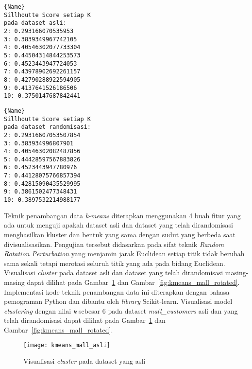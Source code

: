 \noindent\begin{minipage}{.44\textwidth}
\begin{lstlisting}[caption=Sillhoutte Score Dataset (Asli),frame=tlrb, label=mall_customers_siluet_asli]{Name}
Sillhoutte Score setiap K
pada dataset asli: 
2: 0.293166070535953
3: 0.3839349967742105
4: 0.40546302077733304
5: 0.44504314844253573
6: 0.4523443947724053
7: 0.43978902692261157
8: 0.42790288922594905
9: 0.4137641526186506
10: 0.3750147687842441
\end{lstlisting}
\end{minipage}\hfill
\begin{minipage}{.44\textwidth}
\begin{lstlisting}[caption=Sillhoutte Score (Randomisasi),frame=tlrb, label=mall_customers_siluet_randomisasi]{Name}
Sillhoutte Score setiap K
pada dataset randomisasi: 
2: 0.29316607053507854
3: 0.383934996807901
4: 0.40546302082487856
5: 0.44428597567883826
6: 0.4523443947780976
7: 0.44128075766857394
8: 0.42815090435529995
9: 0.3861502477348431
10: 0.3897532214988177
\end{lstlisting}
\end{minipage}

Teknik penambangan data \textit{k-means} diterapkan menggunakan 4 buah fitur yang ada untuk menguji apakah dataset asli dan dataset yang telah dirandomisasi menghasilkan kluster dan bentuk yang sama dengan sudut yang berbeda saat divisualisasikan. Pengujian tersebut didasarkan pada sifat teknik \textit{Random Rotation Perturbation} yang menjamin jarak Euclidean setiap titik tidak berubah sama sekali tetapi merotasi seluruh titik yang ada pada bidang Euclidean. Visualisasi \textit{cluster} pada dataset asli dan dataset yang telah dirandomisasi masing-masing dapat dilihat pada Gambar~\ref{fig:kmeans_mall_asli} dan Gambar~\ref{fig:kmeans_mall_rotated}. Implementasi kode teknik penambangan data ini diterapkan dengan bahasa pemograman Python dan dibantu oleh \textit{library} Scikit-learn. Visualisasi model \textit{clustering} dengan nilai \textit{k} sebesar 6 pada dataset \textit{mall\_customers} asli dan yang telah dirandomisasi dapat dilihat pada Gambar~\ref{fig:kmeans_mall_asli} dan Gambar~\ref{fig:kmeans_mall_rotated}. 

\begin{figure}
	\centering
	\texttt{[image: kmeans\_mall\_asli]}
	\caption{Visualisasi \textit{cluster} pada dataset yang asli}
	\label{fig:kmeans_mall_asli}
\end{figure}

